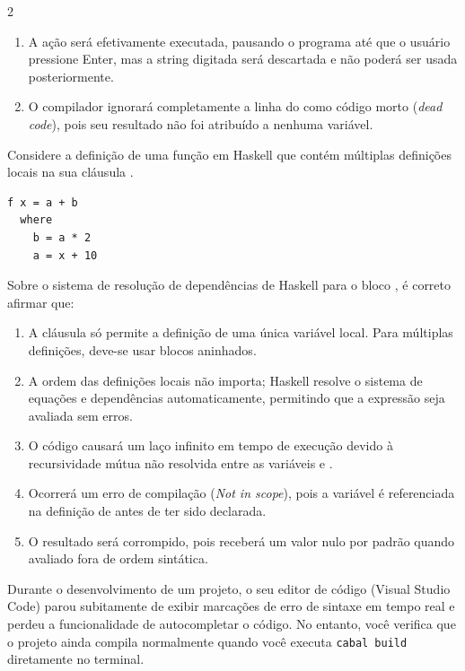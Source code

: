 \documentclass[a4paper,10pt,brazil]{article}
\begin{document}
\begin{multicols}{2}
\begin{enumerate}
  \item A ação  será efetivamente executada, pausando o programa até que o usuário pressione Enter, mas a string digitada será descartada e não poderá ser usada posteriormente.

  \item O compilador ignorará completamente a linha do  como código morto (\emph{dead code}), pois seu resultado não foi atribuído a nenhuma variável.


\end{enumerate}

Considere a definição de uma função  em Haskell que contém múltiplas definições locais na sua cláusula . 
\begin{verbatim}
f x = a + b
  where
    b = a * 2
    a = x + 10
\end{verbatim}
Sobre o sistema de resolução de dependências de Haskell para o bloco , é correto afirmar que:

\begin{enumerate}
  \item A cláusula  só permite a definição de uma única variável local. Para múltiplas definições, deve-se usar blocos  aninhados.

  \item A ordem das definições locais não importa; Haskell resolve o sistema de equações e dependências automaticamente, permitindo que a expressão seja avaliada sem erros.

  \item O código causará um laço infinito em tempo de execução devido à recursividade mútua não resolvida entre as variáveis  e .

  \item Ocorrerá um erro de compilação (\emph{Not in scope}), pois a variável  é referenciada na definição de  antes de ter sido declarada.

  \item O resultado será corrompido, pois  receberá um valor nulo por padrão quando avaliado fora de ordem sintática.


\end{enumerate}

Durante o desenvolvimento de um projeto, o seu editor de código (Visual Studio Code) parou subitamente de exibir marcações de erro de sintaxe em tempo real e perdeu a funcionalidade de autocompletar o código. No entanto, você verifica que o projeto ainda compila normalmente quando você executa \texttt{cabal build} diretamente no terminal. 


\end{multicols}
\end{document}
